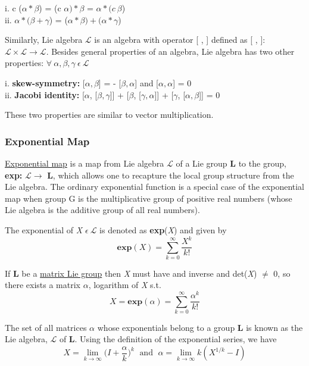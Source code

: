 i. c ($\alpha * \beta$) = (c $\alpha) * \beta$ = $\alpha * (c \: \beta$) \\
ii. $\alpha * (\beta + \gamma $) = ($\alpha * \beta) + (\alpha* \gamma $)

Similarly, Lie algebra $\mathcal{L}$ is an algebra with operator [ , ] defined as [ , ]:$\mathcal{L} \times \mathcal{L} \rightarrow \mathcal{L}$.
Besides general properties of an algebra, Lie algebra has two other properties:
$\forall \: \alpha, \beta, \gamma \: \epsilon \: \mathcal{L}$

i. \textbf{skew-symmetry: } [$\alpha, \beta$] = - [$\beta, \alpha$] and [$\alpha, \alpha$] = 0 \\
ii. \textbf{Jacobi identity: } [$\alpha$, [$\beta, \gamma$]] + [$\beta$, [$\gamma, \alpha$]] + [$\gamma$, [$\alpha, \beta$]] = 0

These two properties are similar to vector multiplication.

\subsubsection{Exponential Map}
\href{https://en.wikipedia.org/wiki/Exponential_map_(Lie_theory)}{Exponential map} is a map from Lie algebra $\mathcal{L}$ of a Lie group \textbf{L} to the group, \textbf{exp:} $\mathcal{L} \rightarrow$ \textbf{L}, 
which allows one to recapture the local group structure from the Lie algebra. The ordinary exponential function is a special case of the exponential map when 
group G is the multiplicative group of positive real numbers (whose Lie algebra is the additive group of all real numbers).

The exponential of \textit{X} $\epsilon \: \mathcal{L}$ is denoted as \textbf{exp}(\textit{X}) and given by
\begin{equation}
    \textbf{exp}(X) = \sum_{k=0}^{\infty} \frac{X^k}{k!}
\end{equation}

If \textbf{L} be a \href{https://en.wikipedia.org/wiki/Lie_group#Matrix_Lie_groups}{matrix Lie group} then \textit{X} must have and inverse and det(\textit{X}) $\neq$ 0, so
there exists a matrix $\alpha$, logarithm of \textit{X} s.t.
\begin{equation}
    X = \textbf{exp}(\alpha) = \sum_{k=0}^{\infty} \frac{\alpha^k}{k!}
\end{equation}

The set of all matrices $\alpha$ whose exponentials belong to a group \textbf{L} is known as the Lie algebra, $\mathcal{L}$ of \textbf{L}.
Using the deﬁnition of the exponential series, we have
\begin{equation}
    X = \lim_{k \rightarrow \infty} \Big(I + \frac{\alpha}{k} \Big)^k \; \text{  and  } \; \alpha = \lim_{k \rightarrow \infty} k(X^{1/k}-I)
\end{equation}

